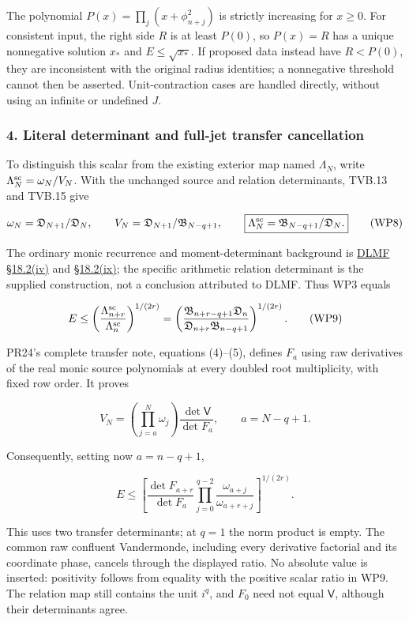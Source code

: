The polynomial \(P(x)=\prod_j(x+\phi_{n+j}^2)\) is strictly increasing for \(x\ge0\). For consistent input, the right side \(R\) is at least \(P(0)\), so \(P(x)=R\) has a unique nonnegative solution \(x_*\) and \(E\le\sqrt{x_*}\). If proposed data instead have \(R<P(0)\), they are inconsistent with the original radius identities; a nonnegative threshold cannot then be asserted. Unit-contraction cases are handled directly, without using an infinite or undefined \(J\).

\subsubsection{4. Literal determinant and full-jet transfer cancellation}\label{endpoint-window_product_owner--literal-determinant-and-full-jet-transfer-cancellation}

To distinguish this scalar from the existing exterior map named \(\Lambda_N\), write \(\Lambda_N^{\rm sc}=\omega_N/V_N\). With the unchanged source and relation determinants, TVB.13 and TVB.15 give

\[
\omega_N=\mathfrak D_{N+1}/\mathfrak D_N,\qquad
V_N=\mathfrak D_{N+1}/\mathfrak B_{N-q+1},\qquad
\boxed{\Lambda_N^{\rm sc}=\mathfrak B_{N-q+1}/\mathfrak D_N.} \tag{WP8}
\]

The ordinary monic recurrence and moment-determinant background is \href{https://dlmf.nist.gov/18.2.iv}{DLMF §18.2(iv)} and \href{https://dlmf.nist.gov/18.2.ix}{§18.2(ix)}; the specific arithmetic relation determinant is the supplied construction, not a conclusion attributed to DLMF. Thus WP3 equals

\[
E\le\left(\frac{\Lambda_{n+r}^{\rm sc}}{\Lambda_n^{\rm sc}}\right)^{1/(2r)}
=\left(\frac{\mathfrak B_{n+r-q+1}\mathfrak D_n}
{\mathfrak D_{n+r}\mathfrak B_{n-q+1}}\right)^{1/(2r)}. \tag{WP9}
\]

PR24's complete transfer note, equations (4)--(5), defines \(F_a\) using raw derivatives of the real monic source polynomials at every doubled root multiplicity, with fixed row order. It proves

\[
V_N=\left(\prod_{j=a}^{N}\omega_j\right)\frac{\det\mathsf V}{\det F_a},
\qquad a=N-q+1.
\]

Consequently, setting now \(a=n-q+1\),

\[
\boxed{E\le\left[
\frac{\det F_{a+r}}{\det F_a}
\prod_{j=0}^{q-2}\frac{\omega_{a+j}}{\omega_{a+r+j}}
\right]^{1/(2r)}.} \tag{WP10}
\]

This uses two transfer determinants; at \(q=1\) the norm product is empty. The common raw confluent Vandermonde, including every derivative factorial and its coordinate phase, cancels through the displayed ratio. No absolute value is inserted: positivity follows from equality with the positive scalar ratio in WP9. The relation map still contains the unit \(i^q\), and \(F_0\) need not equal \(\mathsf V\), although their determinants agree.

